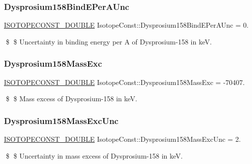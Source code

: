\subsubsection{\texorpdfstring{Dysprosium158\+Bind\+E\+Per\+A\+Unc}{Dysprosium158BindEPerAUnc}}
{\footnotesize\ttfamily \mbox{\hyperlink{group___isotope_const-_macros_ga8f45a7272ce02c0b4c65c44636ed719a}{I\+S\+O\+T\+O\+P\+E\+C\+O\+N\+S\+T\+\_\+\+D\+O\+U\+B\+LE}} Isotope\+Const\+::\+Dysprosium158\+Bind\+E\+Per\+A\+Unc = 0.}

\$ \$ Uncertainty in binding energy per A of Dysprosium-\/158 in keV. \mbox{\label{group___isotope_const-_dysprosium-_dy158_ga8d4823883e42eb4d627a8406b44634e2}} 
\subsubsection{\texorpdfstring{Dysprosium158\+Mass\+Exc}{Dysprosium158MassExc}}
{\footnotesize\ttfamily \mbox{\hyperlink{group___isotope_const-_macros_ga8f45a7272ce02c0b4c65c44636ed719a}{I\+S\+O\+T\+O\+P\+E\+C\+O\+N\+S\+T\+\_\+\+D\+O\+U\+B\+LE}} Isotope\+Const\+::\+Dysprosium158\+Mass\+Exc = -\/70407.}

\$ \$ Mass excess of Dysprosium-\/158 in keV. \mbox{\label{group___isotope_const-_dysprosium-_dy158_ga31095ab0a6fe10bb59df91b484820b6e}} 
\subsubsection{\texorpdfstring{Dysprosium158\+Mass\+Exc\+Unc}{Dysprosium158MassExcUnc}}
{\footnotesize\ttfamily \mbox{\hyperlink{group___isotope_const-_macros_ga8f45a7272ce02c0b4c65c44636ed719a}{I\+S\+O\+T\+O\+P\+E\+C\+O\+N\+S\+T\+\_\+\+D\+O\+U\+B\+LE}} Isotope\+Const\+::\+Dysprosium158\+Mass\+Exc\+Unc = 2.}

\$ \$ Uncertainty in mass excess of Dysprosium-\/158 in keV. \mbox{\label{group___isotope_const-_dysprosium-_dy158_ga22e574996072a25777d771f17c8b0304}} 
